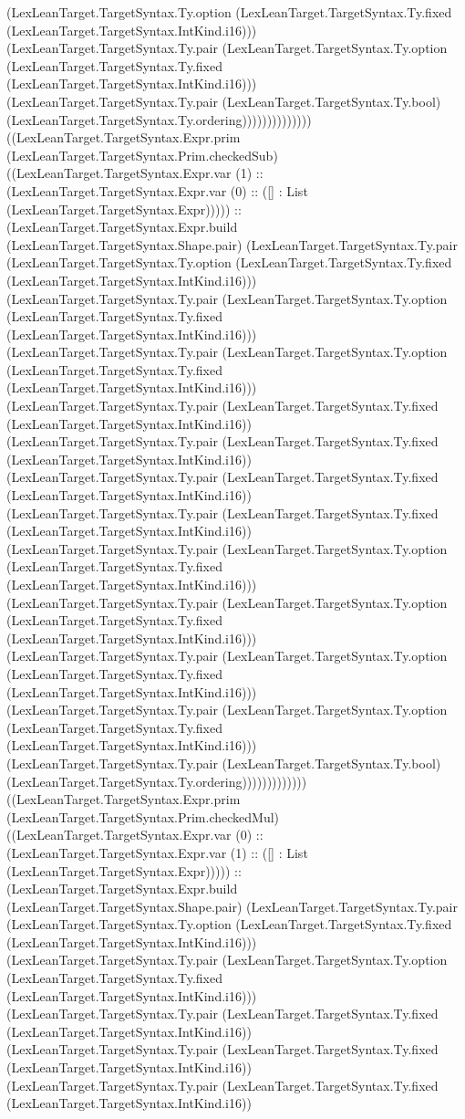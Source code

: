 \documentclass[11pt]{article}
\begin{document}
(LexLeanTarget.TargetSyntax.Ty.option (LexLeanTarget.TargetSyntax.Ty.fixed (LexLeanTarget.TargetSyntax.IntKind.i16))) (LexLeanTarget.TargetSyntax.Ty.pair (LexLeanTarget.TargetSyntax.Ty.option (LexLeanTarget.TargetSyntax.Ty.fixed (LexLeanTarget.TargetSyntax.IntKind.i16))) (LexLeanTarget.TargetSyntax.Ty.pair (LexLeanTarget.TargetSyntax.Ty.bool) (LexLeanTarget.TargetSyntax.Ty.ordering)))))))))))))) ((LexLeanTarget.TargetSyntax.Expr.prim (LexLeanTarget.TargetSyntax.Prim.checkedSub) ((LexLeanTarget.TargetSyntax.Expr.var (1) :: (LexLeanTarget.TargetSyntax.Expr.var (0) :: ([] : List (LexLeanTarget.TargetSyntax.Expr))))) :: (LexLeanTarget.TargetSyntax.Expr.build (LexLeanTarget.TargetSyntax.Shape.pair) (LexLeanTarget.TargetSyntax.Ty.pair (LexLeanTarget.TargetSyntax.Ty.option (LexLeanTarget.TargetSyntax.Ty.fixed (LexLeanTarget.TargetSyntax.IntKind.i16))) (LexLeanTarget.TargetSyntax.Ty.pair (LexLeanTarget.TargetSyntax.Ty.option (LexLeanTarget.TargetSyntax.Ty.fixed (LexLeanTarget.TargetSyntax.IntKind.i16))) (LexLeanTarget.TargetSyntax.Ty.pair (LexLeanTarget.TargetSyntax.Ty.option (LexLeanTarget.TargetSyntax.Ty.fixed (LexLeanTarget.TargetSyntax.IntKind.i16))) (LexLeanTarget.TargetSyntax.Ty.pair (LexLeanTarget.TargetSyntax.Ty.fixed (LexLeanTarget.TargetSyntax.IntKind.i16)) (LexLeanTarget.TargetSyntax.Ty.pair (LexLeanTarget.TargetSyntax.Ty.fixed (LexLeanTarget.TargetSyntax.IntKind.i16)) (LexLeanTarget.TargetSyntax.Ty.pair (LexLeanTarget.TargetSyntax.Ty.fixed (LexLeanTarget.TargetSyntax.IntKind.i16)) (LexLeanTarget.TargetSyntax.Ty.pair (LexLeanTarget.TargetSyntax.Ty.fixed (LexLeanTarget.TargetSyntax.IntKind.i16)) (LexLeanTarget.TargetSyntax.Ty.pair (LexLeanTarget.TargetSyntax.Ty.option (LexLeanTarget.TargetSyntax.Ty.fixed (LexLeanTarget.TargetSyntax.IntKind.i16))) (LexLeanTarget.TargetSyntax.Ty.pair (LexLeanTarget.TargetSyntax.Ty.option (LexLeanTarget.TargetSyntax.Ty.fixed (LexLeanTarget.TargetSyntax.IntKind.i16))) (LexLeanTarget.TargetSyntax.Ty.pair (LexLeanTarget.TargetSyntax.Ty.option (LexLeanTarget.TargetSyntax.Ty.fixed (LexLeanTarget.TargetSyntax.IntKind.i16))) (LexLeanTarget.TargetSyntax.Ty.pair (LexLeanTarget.TargetSyntax.Ty.option (LexLeanTarget.TargetSyntax.Ty.fixed (LexLeanTarget.TargetSyntax.IntKind.i16))) (LexLeanTarget.TargetSyntax.Ty.pair (LexLeanTarget.TargetSyntax.Ty.bool) (LexLeanTarget.TargetSyntax.Ty.ordering))))))))))))) ((LexLeanTarget.TargetSyntax.Expr.prim (LexLeanTarget.TargetSyntax.Prim.checkedMul) ((LexLeanTarget.TargetSyntax.Expr.var (0) :: (LexLeanTarget.TargetSyntax.Expr.var (1) :: ([] : List (LexLeanTarget.TargetSyntax.Expr))))) :: (LexLeanTarget.TargetSyntax.Expr.build (LexLeanTarget.TargetSyntax.Shape.pair) (LexLeanTarget.TargetSyntax.Ty.pair (LexLeanTarget.TargetSyntax.Ty.option (LexLeanTarget.TargetSyntax.Ty.fixed (LexLeanTarget.TargetSyntax.IntKind.i16))) (LexLeanTarget.TargetSyntax.Ty.pair (LexLeanTarget.TargetSyntax.Ty.option (LexLeanTarget.TargetSyntax.Ty.fixed (LexLeanTarget.TargetSyntax.IntKind.i16))) (LexLeanTarget.TargetSyntax.Ty.pair (LexLeanTarget.TargetSyntax.Ty.fixed (LexLeanTarget.TargetSyntax.IntKind.i16)) (LexLeanTarget.TargetSyntax.Ty.pair (LexLeanTarget.TargetSyntax.Ty.fixed (LexLeanTarget.TargetSyntax.IntKind.i16)) (LexLeanTarget.TargetSyntax.Ty.pair (LexLeanTarget.TargetSyntax.Ty.fixed (LexLeanTarget.TargetSyntax.IntKind.i16)) 
\end{document}
